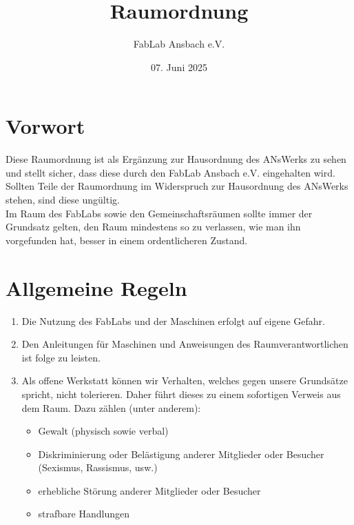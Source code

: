 \title{Raumordnung}
\author{FabLab Ansbach e.V.}
\date{07. Juni 2025}


\usepackage{enumitem}


\setlength{\parskip}{0.5em}
\setlength{\parindent}{0pt}

\maketitle

\section{Vorwort}
Diese Raumordnung ist als Ergänzung zur Hausordnung des ANsWerks zu sehen und stellt sicher, dass diese durch den FabLab Ansbach e.V. eingehalten wird. \\
Sollten Teile der Raumordnung im Widerspruch zur Hausordnung des ANsWerks stehen, sind diese ungültig. \\
Im Raum des FabLabs sowie den Gemeinschaftsräumen sollte immer der Grundsatz gelten, den Raum mindestens so zu verlassen, wie man ihn vorgefunden hat, besser in einem ordentlicheren Zustand.

\section{Allgemeine Regeln}
\begin{enumerate}
  \item Die Nutzung des FabLabs und der Maschinen erfolgt auf eigene Gefahr. 
  \item Den Anleitungen für Maschinen und Anweisungen des Raumverantwortlichen ist folge zu leisten.
  \item Als offene Werkstatt können wir Verhalten, welches gegen unsere Grundsätze spricht, nicht tolerieren. Daher führt dieses zu einem sofortigen Verweis aus dem Raum.
        Dazu zählen (unter anderem):
        \begin{itemize}
          \item Gewalt (physisch sowie verbal)
          \item Diskriminierung oder Belästigung anderer Mitglieder oder Besucher (Sexismus, Rassismus, usw.)
          \item erhebliche Störung anderer Mitglieder oder Besucher
          \item strafbare Handlungen
        \end{itemize}
\end{enumerate}

